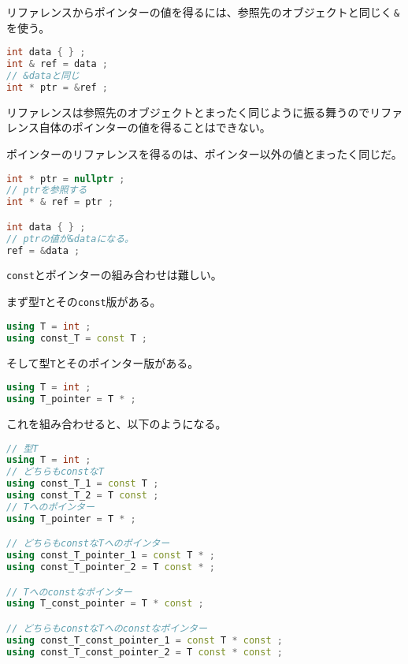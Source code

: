 リファレンスからポインターの値を得るには、参照先のオブジェクトと同じく\,\texttt{\&}\,を使う。

\begin{lstlisting}[language={C++}]
int data { } ;
int & ref = data ;
// &dataと同じ
int * ptr = &ref ;
\end{lstlisting}

リファレンスは参照先のオブジェクトとまったく同じように振る舞うのでリファレンス自体のポインターの値を得ることはできない。

ポインターのリファレンスを得るのは、ポインター以外の値とまったく同じだ。

\begin{lstlisting}[language={C++}]
int * ptr = nullptr ;
// ptrを参照する
int * & ref = ptr ;

int data { } ;
// ptrの値が&dataになる。
ref = &data ;
\end{lstlisting}

\texttt{const}とポインターの組み合わせは難しい。

まず型\texttt{T}とその\texttt{const}版がある。

\begin{lstlisting}[language={C++}]
using T = int ;
using const_T = const T ;
\end{lstlisting}

そして型\texttt{T}とそのポインター版がある。

\begin{lstlisting}[language={C++}]
using T = int ;
using T_pointer = T * ;
\end{lstlisting}

これを組み合わせると、以下のようになる。

\ifTombow\pagebreak\fi
\begin{lstlisting}[language={C++}]
// 型T
using T = int ;
// どちらもconstなT
using const_T_1 = const T ;
using const_T_2 = T const ;
// Tへのポインター
using T_pointer = T * ;

// どちらもconstなTへのポインター
using const_T_pointer_1 = const T * ;
using const_T_pointer_2 = T const * ;

// Tへのconstなポインター
using T_const_pointer = T * const ;

// どちらもconstなTへのconstなポインター
using const_T_const_pointer_1 = const T * const ;
using const_T_const_pointer_2 = T const * const ;
\end{lstlisting}

